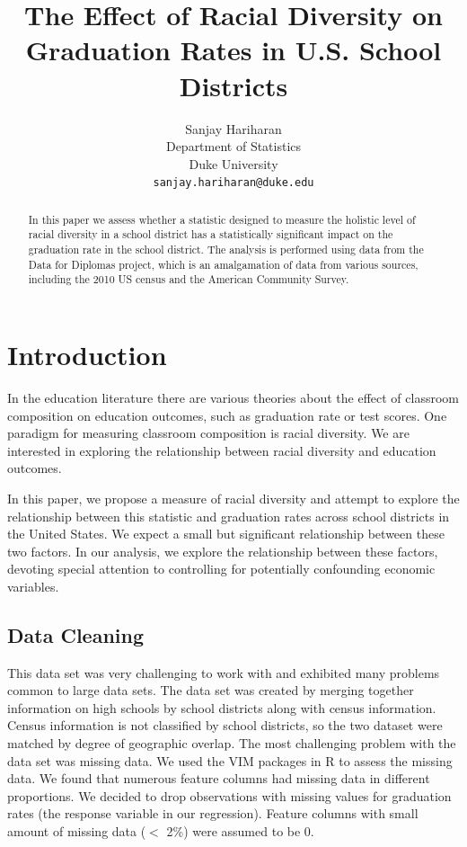 \documentclass{article}
\title{The Effect of Racial Diversity on Graduation Rates in U.S. School Districts}
\author{
Sanjay Hariharan \\
Department of Statistics\\
Duke University\\
\texttt{sanjay.hariharan@duke.edu} \\
}
\begin{document}
\maketitle


\begin{abstract}
In this paper we assess whether a statistic designed to measure the holistic level of racial diversity in a school district has a statistically significant impact on the graduation rate in the school district.  The analysis is performed using data from the Data for Diplomas project, which is an amalgamation of data from various sources, including the 2010 US census and the American Community Survey.  
\end{abstract}


\section{Introduction}\label{background}

In the education literature there are various theories about the effect of classroom composition \cite{paper2} on education outcomes, such as graduation rate or test scores. One paradigm for measuring classroom composition is racial diversity.  We are interested in exploring the relationship between racial diversity and education outcomes\cite{paper1}.

In this paper, we propose a measure of racial diversity and attempt to explore the relationship between this statistic and graduation rates across school districts in the United States. We expect a small but significant relationship between these two factors. In our analysis, we explore the relationship between these factors, devoting special attention to controlling for potentially confounding economic variables. 


 \subsection{Data Cleaning}\label{dataset}
This data set was very challenging to work with and exhibited many problems common to large data sets.  The data set was created by merging together information on high schools by school districts along with census information. Census information is not classified by school districts, so the two dataset were matched by degree of geographic overlap.  The most challenging problem with the data set was missing data.  We used the VIM packages in R to assess the missing data.  We found that numerous feature columns had missing data in different proportions.  We decided to drop observations with missing values for graduation rates (the response variable in our regression). Feature columns with small amount of missing data ($<$ 2\%) were assumed to be 0. 
\end{document}
